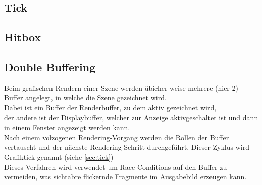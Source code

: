 \subsection{Tick}

\subsection{Hitbox}

\subsection{Double Buffering}
\label{sec:doublebuffer}
Beim grafischen Rendern einer Szene werden übicher weise mehrere (hier 2) Buffer angelegt, in welche die Szene gezeichnet wird.\\
Dabei ist ein Buffer der Renderbuffer, zu dem aktiv gezeichnet wird,\\
der andere ist der Displaybuffer, welcher zur Anzeige aktivgeschaltet ist und dann in einem Fenster angezeigt werden kann.\\
Nach einem volzogenen Rendering-Vorgang werden die Rollen der Buffer vertauscht und der nächste Rendering-Schritt durchgeführt. Dieser Zyklus wird Grafiktick genannt (siehe \ref{sec:tick})\\
Dieses Verfahren wird verwendet um Race-Conditions auf den Buffer zu vermeiden, was sichtabre flickernde Fragmente im Ausgabebild erzeugen kann.
